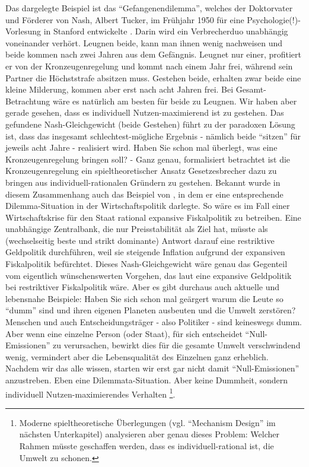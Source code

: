 Das dargelegte Beispiel ist das "`Gefangenendilemma"', welches der Doktorvater und Förderer von Nash, Albert Tucker, im Frühjahr 1950 für eine Psychologie(!)-Vorlesung in Stanford entwickelte \parencite[S. 161]{Nash1994}. Darin wird ein Verbrecherduo unabhängig voneinander verhört. Leugnen beide, kann man ihnen wenig nachweisen und beide kommen nach zwei Jahren aus dem Gefängnis. Leugnet nur einer, profitiert er von der Kronzeugenregelung und kommt nach einem Jahr frei, während sein Partner die Höchststrafe absitzen muss. Gestehen beide, erhalten zwar beide eine kleine Milderung, kommen aber erst nach acht Jahren frei. Bei Gesamt-Betrachtung wäre es natürlich am besten für beide zu Leugnen. Wir haben aber gerade gesehen, dass es individuell Nutzen-maximierend ist zu gestehen. Das gefundene Nash-Gleichgewicht (beide Gestehen) führt zu der paradoxen Lösung ist, dass das insgesamt schlechtest-mögliche Ergebnis - nämlich beide "`sitzen"' für jeweils acht Jahre - realisiert wird. Haben Sie schon mal überlegt, was eine Kronzeugenregelung bringen soll? - Ganz genau, formalisiert betrachtet ist die Kronzeugenregelung ein spieltheoretischer Ansatz Gesetzesbrecher dazu zu bringen aus individuell-rationalen Gründern zu gestehen. Bekannt wurde in diesem Zusammenhang auch das Beispiel von \textcite{Blinder1982}, in dem er eine entsprechende Dilemma-Situation in der Wirtschaftspolitik darlegte. So wäre es im Fall einer Wirtschaftskrise für den Staat rational expansive Fiskalpolitik zu betreiben. Eine unabhängige Zentralbank, die nur Preisstabilität als Ziel hat, müsste als (wechselseitig beste und strikt dominante) Antwort darauf eine restriktive Geldpolitik durchführen, weil sie steigende Inflation aufgrund der expansiven Fiskalpolitik befürchtet. Dieses Nash-Gleichgewicht wäre genau das Gegenteil vom eigentlich wünschenswerten Vorgehen, das laut \textcite{Blinder1982} eine expansive Geldpolitik bei restriktiver Fiskalpolitik wäre. Aber es gibt durchaus auch aktuelle und lebensnahe Beispiele: Haben Sie sich schon mal geärgert warum die Leute so "`dumm"' sind und ihren eigenen Planeten ausbeuten und die Umwelt zerstören? Menschen und auch Entscheidungsträger - also Politiker - sind keineswegs dumm. Aber wenn eine einzelne Person (oder Staat), für sich entscheidet "`Null-Emissionen"' zu verursachen, bewirkt dies für die gesamte Umwelt verschwindend wenig, vermindert aber die Lebensqualität des Einzelnen ganz erheblich. Nachdem wir das alle wissen, starten wir erst gar nicht damit "`Null-Emissionen"' anzustreben. Eben eine Dilemmata-Situation. Aber keine Dummheit, sondern individuell Nutzen-maximierendes Verhalten \parencite{Samuelson1954}\footnote{Moderne spieltheoretische Überlegungen (vgl. "`Mechanism Design"' im nächsten Unterkapitel) analysieren aber genau dieses Problem: Welcher Rahmen müsste geschaffen werden, dass es individuell-rational ist, die Umwelt zu schonen.}.


